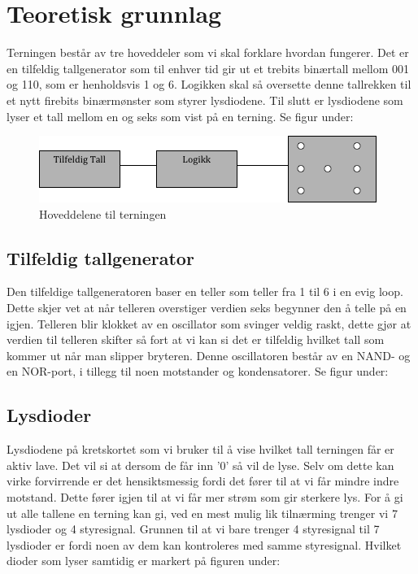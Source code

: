 \documentclass[12pt,norsk,a4paper]{article}
\begin{document}
\clearpage

\section{Teoretisk grunnlag}
Terningen består av tre hoveddeler som vi skal forklare hvordan fungerer. Det er en tilfeldig tallgenerator som til enhver tid
gir ut et trebits binærtall mellom 001 og 110, som er henholdsvis 1 og 6. Logikken skal så oversette denne tallrekken til et nytt firebits binærmønster som styrer lysdiodene. Til slutt er lysdiodene som lyser et tall mellom en og seks som vist på en terning. Se figur under:
\begin{figure}[H]
\includegraphics{Blokkskjema.png}
\caption{Hoveddelene til terningen}
\label{fig:blokkskjema}
\end{figure}

    \subsection{Tilfeldig tallgenerator}
    Den tilfeldige tallgeneratoren baser en teller som teller fra 1 til 6 i en evig loop. Dette skjer vet at når telleren overstiger verdien seks begynner den å telle på en igjen. Telleren blir klokket av en oscillator som svinger
    veldig raskt, dette gjør at verdien til telleren skifter så fort at vi kan si det er tilfeldig hvilket tall som kommer ut når man slipper bryteren. Denne oscillatoren består av en NAND- og en NOR-port, i tillegg til noen motstander og kondensatorer. Se figur under:

    
    \subsection{Lysdioder}
    Lysdiodene på kretskortet som vi bruker til å vise hvilket tall terningen får er aktiv lave. Det vil si at dersom de får inn '0'
    så vil de lyse. Selv om dette kan virke forvirrende er det hensiktsmessig fordi det fører til at vi får mindre indre motstand. Dette fører igjen til at vi får mer strøm som gir sterkere lys. For å gi ut alle tallene en terning kan gi, ved en mest mulig lik tilnærming trenger vi 7 lysdioder og 4 styresignal. Grunnen til at vi bare trenger 4 styresignal til 7 lysdioder er fordi noen av dem kan kontroleres med samme styresignal. Hvilket dioder som lyser samtidig er markert på figuren under:
\end{document}
